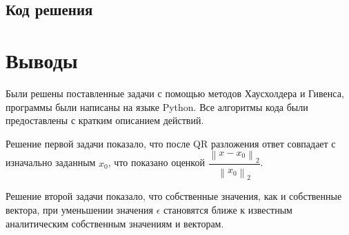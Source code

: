 \documentclass[a4paper]{article}
\begin{document}
\newpage

\subsection{Код решения}



\newpage

\section{Выводы}

Были решены поставленные задачи с помощью методов Хаусхолдера и Гивенса, программы были написаны на языке Python. Все алгоритмы кода были предоставлены с кратким описанием действий. 

Решение первой задачи показало, что после QR разложения ответ совпадает с изначально заданным $x_0$, что показано оценкой $\dfrac{\left \| x - x_0 \right \|_{2}} {\left \| x_0 \right \|_{2}}$.

Решение второй задачи показало, что собственные значения, как и собственные вектора, при уменьшении значения $\epsilon$ становятся ближе к известным аналитическим собственным значениям и векторам. 
\end{document}
